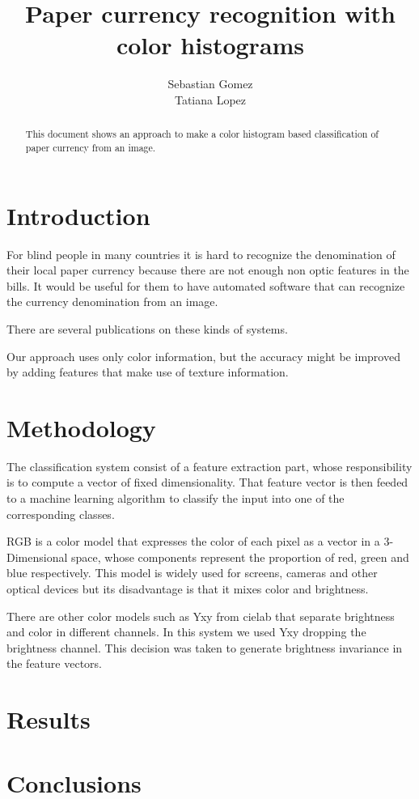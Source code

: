 \documentclass{article}
\begin{document}
\title{Paper currency recognition with color histograms}
\author{Sebastian Gomez \\ Tatiana Lopez}
\maketitle

\begin{abstract}
This document shows an approach to make a color histogram based classification of paper currency from an image.
\end{abstract}

\section{Introduction}
For blind people in many countries it is hard to recognize the denomination of their local paper currency because
there are not enough non optic features in the bills. It would be useful for them to have automated software that
can recognize the currency denomination from an image.

There are several publications on these kinds of systems. %

Our approach uses only color information, but the accuracy might be improved by adding features that make use of
texture information.

\section{Methodology}

The classification system consist of a feature extraction part, whose responsibility is to compute a vector of
fixed dimensionality. That feature vector is then feeded to a machine learning algorithm to classify the input
into one of the corresponding classes.

RGB is a color model that expresses the color of each pixel as a vector in a 3-Dimensional space, whose components
represent the proportion of red, green and blue respectively. This model is widely used for screens, cameras and
other optical devices but its disadvantage is that it mixes color and brightness.

There are other color models such as Yxy from cielab that separate brightness and color in different channels. In
this system we used Yxy dropping the brightness channel. This decision was taken to generate brightness invariance
in the feature vectors. %


\section{Results}

\section{Conclusions}
\end{document}
